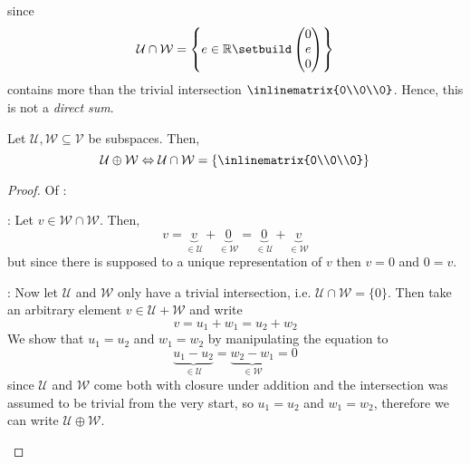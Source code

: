\begin{exm}
\begin{enumerate}
		      since
		      \begin{equation*}
			      \mathcal{U}\cap\mathcal{W}=\left\{e\in\mathbb{R}\setbuild\begin{pmatrix}
				      0 \\e\\0
			      \end{pmatrix}\right\}
		      \end{equation*}
		      contains more than the trivial intersection
		      $\inlinematrix{0\\0\\0}$. Hence, this
		      is not a \textit{direct sum}.
	\end{enumerate}
\end{exm}

\begin{thm}\label{thm-direct-sum}
	Let $\mathcal{U},\mathcal{W}\subseteq\mathcal{V}$ be subspaces. Then,
	\begin{equation}
		\mathcal{U}\oplus\mathcal{W}\Leftrightarrow
		\mathcal{U}\cap\mathcal{W}=
		\left\{\inlinematrix{0\\0\\0}\right\}
	\end{equation}
\end{thm}

\begin{proof}
	Of :
	\begin{flushleft}
		\proofright: Let $v\in\mathcal{W}\cap\mathcal{W}$.
		Then,
		\begin{equation*}
			v=\underbrace{v}_{\in\mathcal{U}}+\underbrace{0}_{\in\mathcal{W}}
			=\underbrace{0}_{\in\mathcal{U}}+\underbrace{v}_{\in\mathcal{W}}
		\end{equation*}
		but since there is supposed to a unique representation of $v$ then
		$v=0$ and $0=v$.
	\end{flushleft}
	\begin{flushleft}
		\proofleft: Now let $\mathcal{U}$ and $\mathcal{W}$ only have a trivial
		intersection, i.e. $\mathcal{U}\cap\mathcal{W}=\{0\}$. Then take an arbitrary
		element $v\in\mathcal{U}+\mathcal{W}$ and write
		\begin{equation*}
			v=u_1+w_1=u_2+w_2
		\end{equation*}
		We show that $u_1=u_2$ and $w_1=w_2$ by manipulating the equation to
		\begin{equation*}
			\underbrace{u_1-u_2}_{\in\mathcal{U}}=\underbrace{w_2-w_1}_{\in\mathcal{W}}=0
		\end{equation*}
		since $\mathcal{U}$ and $\mathcal{W}$ come both with closure under addition
		and the intersection was assumed to be trivial from the very start, so
		$u_1=u_2$ and $w_1=w_2$, therefore we can write $\mathcal{U}\oplus\mathcal{W}$.
	\end{flushleft}
\end{proof}
